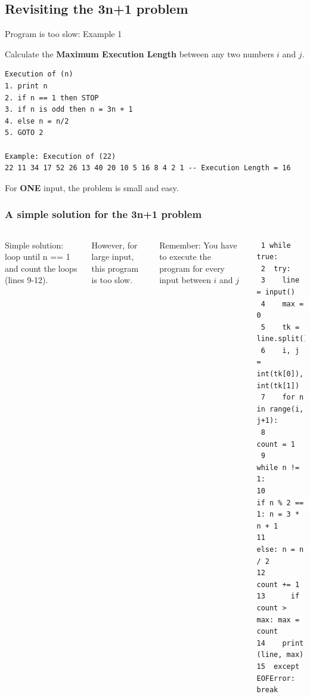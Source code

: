 
\subsection{Revisiting the 3n+1 problem}

\begin{frame}[fragile]{Program is too slow: Example 1}

  \begin{block}{}
    Calculate the {\bf Maximum Execution Length} between any two numbers $i$ and $j$.
  \end{block}
  \smallskip

\begin{verbatim}
Execution of (n)
1. print n
2. if n == 1 then STOP
3. if n is odd then n = 3n + 1
4. else n = n/2
5. GOTO 2

Example: Execution of (22)
22 11 34 17 52 26 13 40 20 10 5 16 8 4 2 1 -- Execution Length = 16
\end{verbatim}
For {\bf ONE} input, the problem is small and easy.
\end{frame}

\begin{frame}[fragile]
  \frametitle{A simple solution for the 3n+1 problem}
  \begin{columns}
    Simple solution: loop until n == 1 and count the loops (lines 9-12).\bigskip

    However, for large input, this program is too slow.\bigskip

    \alert{Remember}: You have to execute the program for \alert{every input} between $i$ and $j$
  {\smaller
\begin{verbatim}
 1 while true:
 2  try:
 3    line = input()
 4    max = 0
 5    tk = line.split()
 6    i, j = int(tk[0]), int(tk[1])
 7    for n in range(i, j+1):
 8      count = 1
 9      while n != 1:
10        if n % 2 == 1: n = 3 * n + 1
11        else: n = n / 2
12        count += 1
13      if count > max: max = count
14    print (line, max)
15  except EOFError: break
\end{verbatim}}
\end{columns}
\end{frame}

